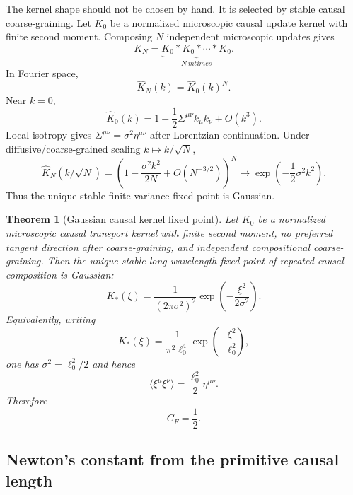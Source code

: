 \documentclass[11pt]{article}
\newtheorem{theorem}[definition]{Theorem}
\begin{document}
The kernel shape should not be chosen by hand. It is selected by stable causal coarse-graining. Let $K_0$ be a normalized microscopic causal update kernel with finite second moment. Composing $N$ independent microscopic updates gives
\begin{equation}
K_N=\underbrace{K_0*K_0*\cdots*K_0}_{N\ {
m times}}.
\end{equation}
In Fourier space,
\begin{equation}
\widehat K_N(k)=\widehat K_0(k)^N.
\end{equation}
Near $k=0$,
\begin{equation}
\widehat K_0(k)=1-\frac12\Sigma^{\mu\nu}k_\mu k_\nu+O(k^3).
\end{equation}
Local isotropy gives $\Sigma^{\mu\nu}=\sigma^2\eta^{\mu\nu}$ after Lorentzian continuation. Under diffusive/coarse-grained scaling $k\mapsto k/\sqrt N$,
\begin{equation}
\widehat K_N(k/\sqrt N)=\left(1-\frac{\sigma^2k^2}{2N}+O(N^{-3/2})\right)^N\longrightarrow \exp\left(-\frac12\sigma^2k^2\right).
\end{equation}
Thus the unique stable finite-variance fixed point is Gaussian.

\begin{theorem}[Gaussian causal kernel fixed point]
Let $K_0$ be a normalized microscopic causal transport kernel with finite second moment, no preferred tangent direction after coarse-graining, and independent compositional coarse-graining. Then the unique stable long-wavelength fixed point of repeated causal composition is Gaussian:
\begin{equation}
K_*(\xi)=\frac{1}{(2\pi\sigma^2)^2}\exp\left(-\frac{\xi^2}{2\sigma^2}\right).
\end{equation}
Equivalently, writing
\begin{equation}
K_*(\xi)=\frac{1}{\pi^2\ell_0^4}\exp\left(-\frac{\xi^2}{\ell_0^2}\right),
\end{equation}
one has $\sigma^2=\ell_0^2/2$ and hence
\begin{equation}
\boxed{\langle \xi^\mu\xi^\nu\rangle=\frac{\ell_0^2}{2}\eta^{\mu\nu}.}
\end{equation}
Therefore
\begin{equation}
\boxed{C_F=\frac12.}
\end{equation}
\end{theorem}

\subsection{Newton's constant from the primitive causal length}
\end{document}
